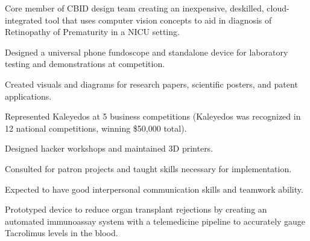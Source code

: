 \documentclass[]{deedy-resume}
\begin{document}
\begin{minipage}[t]{0.66\textwidth}
\begin{tightemize}
\item Core member of CBID design team creating an inexpensive, deskilled, cloud-integrated tool that uses computer vision concepts to aid in diagnosis of Retinopathy of Prematurity in a NICU setting.
\item Designed a universal phone fundoscope and standalone device for laboratory testing and demonstrations at competition.
\item Created visuals and diagrams for research papers, scientific posters, and patent applications.
\item Represented Kaleyedos at 5 business competitions (Kaleyedos was recognized in 12 national competitions, winning \$50,000 total).
\end{tightemize}
\sectionsep

\begin{tightemize}
\item Designed hacker workshops and maintained 3D printers.
\item Consulted for patron projects and taught skills necessary for implementation.
\item Expected to have good interpersonal communication skills and teamwork ability.
\end{tightemize}
\sectionsep

\begin{tightemize}
\item Prototyped device to reduce organ transplant rejections by creating an automated immunoassay system with a telemedicine pipeline to accurately gauge Tacrolimus levels in the blood.
\end{tightemize}
\sectionsep



\end{minipage}
\end{document}
